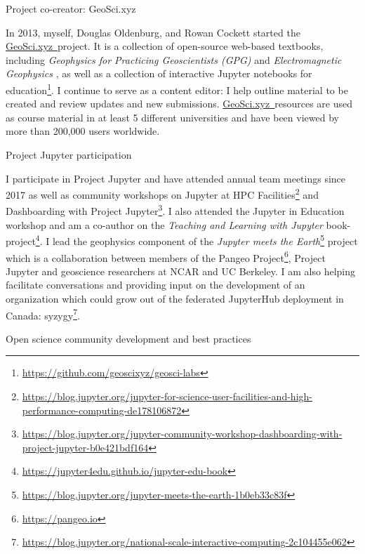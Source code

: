 \documentclass[a4paper, 11pt]{article}
\newcommand{\gpg}{\href{https://gpg.geosci.xyz}{https://gpg.geosci.xyz}}
\newcommand{\emgeosci}{\href{https://em.geosci.xyz}{https://em.geosci.xyz}}
\newcommand{\GeoSci}{\href{https://geosci.xyz}{GeoSci.xyz~}}
\newcommand{\subheading}[1]{
    \vspace{0.4cm}
    {\Large #1}\\
    \vspace{-0.2cm}
}
\begin{document}
\subheading{Project co-creator: GeoSci.xyz}

In 2013, myself, Douglas Oldenburg, and Rowan Cockett started the \GeoSci project. It is a collection of open-source web-based textbooks, including \emph{Geophysics for Practicing Geoscientists (GPG)}
and \emph{Electromagnetic Geophysics}
, as well as a collection of interactive Jupyter notebooks for education\footnote{\href{https://github.com/geoscixyz/geosci-labs}{https://github.com/geoscixyz/geosci-labs}}. I continue to serve as a content editor: I help outline material to be created and review updates and new submissions. \GeoSci resources are used as course material in at least 5 different universities and have been viewed by more than 200,000 users worldwide.

\subheading{Project Jupyter participation}

I participate in Project Jupyter and have attended annual team meetings since 2017 as well as community workshops on Jupyter at HPC Facilities\footnote{\href{https://blog.jupyter.org/jupyter-for-science-user-facilities-and-high-performance-computing-de178106872}{https://blog.jupyter.org/jupyter-for-science-user-facilities-and-high-performance-computing-de178106872}}
and Dashboarding with Project Jupyter\footnote{\href{https://blog.jupyter.org/jupyter-community-workshop-dashboarding-with-project-jupyter-b0e421bdf164}{https://blog.jupyter.org/jupyter-community-workshop-dashboarding-with-project-jupyter-b0e421bdf164}}.
I also attended the Jupyter in Education workshop and am a co-author on the \emph{Teaching and Learning with Jupyter} book-project\footnote{\href{https://jupyter4edu.github.io/jupyter-edu-book}{https://jupyter4edu.github.io/jupyter-edu-book}}. I lead the geophysics component of the \emph{Jupyter meets the Earth}\footnote{\href{https://blog.jupyter.org/jupyter-meets-the-earth-1b0eb33c83f}{https://blog.jupyter.org/jupyter-meets-the-earth-1b0eb33c83f}} project which is a collaboration between members of the Pangeo Project\footnote{\href{https://pangeo.io}{https://pangeo.io}}, Project Jupyter and geoscience researchers at NCAR and UC Berkeley. I am also helping facilitate conversations and providing input on the development of an organization which could grow out of the federated JupyterHub deployment in Canada: syzygy\footnote{\href{https://blog.jupyter.org/national-scale-interactive-computing-2c104455e062}{https://blog.jupyter.org/national-scale-interactive-computing-2c104455e062}}.

\subheading{Open science community development and best practices}
\end{document}
